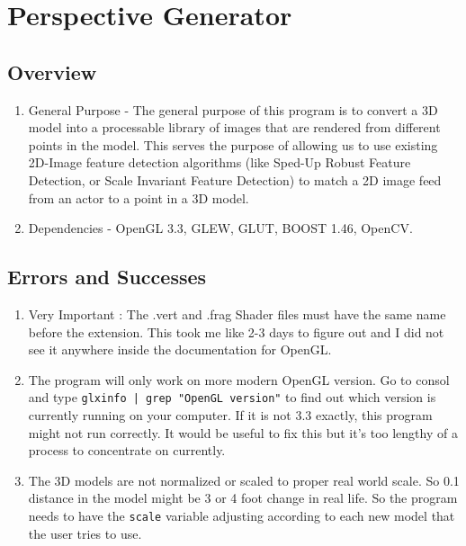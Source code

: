 \documentclass[a4paper,11pt]{article}
\begin{document}
    \section{Perspective Generator}

        \subsection{Overview}
        \begin{enumerate}
        \item General Purpose - The general purpose of this program is to convert a 3D model into a processable library of images that are rendered from different points in the model. This serves the purpose of allowing us to use existing 2D-Image feature detection algorithms (like Sped-Up Robust Feature Detection, or Scale Invariant Feature Detection) to match a 2D image feed from an actor to a point in a 3D model.
        \item Dependencies - OpenGL 3.3, GLEW, GLUT, BOOST 1.46, OpenCV.
        \end{enumerate}

        \subsection{Errors and Successes}
        \begin{enumerate}
        \item Very Important : The .vert and .frag Shader files must have the same name before the extension. This took me like 2-3 days to figure out and I did not see it anywhere inside the documentation for OpenGL.
        \item The program will only work on more modern OpenGL version. Go to consol and type \texttt{glxinfo | grep "OpenGL version"} to find out which version is currently running on your computer. If it is not 3.3 exactly, this program might not run correctly. It would be useful to fix this but it's too lengthy of a process to concentrate on currently.
        \item The 3D models are not normalized or scaled to proper real world scale. So 0.1 distance in the model might be 3 or 4 foot change in real life. So the program needs to have the \texttt{scale} variable adjusting according to each new model that the user tries to use.
        \end{enumerate}
\end{document}

